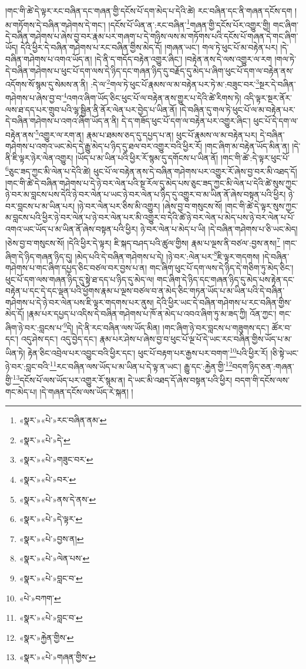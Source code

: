 །གང་གི་ཚེ་དེ་ལྟར་རང་བཞིན་དང་གཞན་གྱི་དངོས་པོ་དག་མེད་པ་དེའི་ཚེ། རང་བཞིན་དང་ནི་གཞན་དངོས་དག །མ་གཏོགས་དེ་བཞིན་གཤེགས་དེ་གང་། །དངོས་པོ་ཡིན་ན་:རང་བཞིན་\footnote{«སྣར་»«པེ་»རང་བཞིན་ནམ་}གཞན་གྱི་དངོས་པོར་འགྱུར་གྱི། གང་ཞིག་དེ་བཞིན་གཤེགས་པ་ཞེས་བྱ་བར་རྣམ་པར་གཞག་པ་དེ་གཉིས་ལས་མ་གཏོགས་པའི་དངོས་པོ་གཞན་དེ་གང་ཞིག་ཡོད། དེའི་ཕྱིར་དེ་བཞིན་གཤེགས་པ་རང་བཞིན་གྱིས་མེད་དོ། །གཞན་ཡང་། གལ་ཏེ་ཕུང་པོ་མ་བརྟེན་པར། །དེ་བཞིན་གཤེགས་པ་འགའ་ཡོད་ན། །དེ་ནི་ད་གདོད་བརྟེན་འགྱུར་ཞིང་། །བརྟེན་ནས་དེ་ལས་འགྱུར་ལ་རག །གལ་ཏེ་དེ་བཞིན་གཤེགས་པ་ཕུང་པོ་དག་ལས་དེ་ཉིད་དང་གཞན་ཉིད་དུ་བརྗོད་དུ་མེད་པ་ཞིག་ཕུང་པོ་དག་ལ་བརྟེན་ནས་འདོགས་སོ་སྙམ་དུ་སེམས་ན་ནི། :དེ་ལ་\footnote{«སྣར་»«པེ་»དེ་}གལ་ཏེ་ཕུང་པོ་རྣམས་ལ་མ་བརྟེན་པར་ཏེ་མ་:བཟུང་བར་\footnote{«སྣར་»«པེ་»གཟུང་བར་}སྔར་དེ་བཞིན་གཤེགས་པ་ཞེས་བྱ་བ་\footnote{«སྣར་»«པེ་»བར་}འགའ་ཞིག་ཡོད་ཅིང་ཕུང་པོ་ལ་བརྟེན་ནས་གྱུར་པ་དེའི་ཚེ་རིགས་ཏེ། འདི་ལྟར་སྔར་ནོར་ལས་ཐ་དད་པར་གྲུབ་པའི་ལྷ་སྦྱིན་ནི་ནོར་ལེན་པར་བྱེད་པ་ཡིན་ནོ། །དེ་བཞིན་དུ་གལ་ཏེ་ཕུང་པོ་ལ་མ་བརྟེན་པར་དེ་བཞིན་གཤེགས་པ་འགའ་ཞིག་ཡོད་ན་ནི། དེ་ད་གཟོད་ཕུང་པོ་དག་ལ་བརྟེན་པར་འགྱུར་ཞིང་། ཕུང་པོ་དེ་དག་ལ་བརྟེན་ནས་\footnote{«སྣར་»«པེ་»ནས་དེ་ནས་}འགྱུར་ལ་རག་ན། རྣམ་པ་ཐམས་ཅད་དུ་དཔྱད་པ་ན། ཕུང་པོ་རྣམས་ལ་མ་བརྟེན་པར། དེ་བཞིན་གཤེགས་པ་འགའ་ཡང་མེད་དེ་རྒྱུ་མེད་པ་ཉིད་དུ་ཐལ་བར་འགྱུར་བའི་ཕྱིར་རོ། །གང་ཞིག་མ་བརྟེན་ཡོད་མིན་ན། །དེ་ནི་ཇི་ལྟར་ཉེར་ལེན་འགྱུར། །ཡོད་པ་མ་ཡིན་པའི་ཕྱིར་རོ་སྙམ་དུ་དགོངས་པ་ཡིན་ནོ། །གང་གི་ཚེ་:དེ་ལྟར་ཕུང་པོ་\footnote{«སྣར་»«པེ་»དེ་ལྟར་}ཅུང་ཟད་ཀྱང་མི་ལེན་པ་དེའི་ཚེ། ཕུང་པོ་ལ་བརྟེན་ནས་དེ་བཞིན་གཤེགས་པར་འགྱུར་རོ་ཞེས་བྱ་བར་མི་འཐད་དོ། །གང་གི་ཚེ་དེ་བཞིན་གཤེགས་པ་དེ་ཉེ་བར་ལེན་པའི་སྔ་རོལ་དུ་མེད་པས་ཅུང་ཟད་ཀྱང་མི་ལེན་པ་དེའི་ཚེ་སུས་ཀྱང་ཉེ་བར་མ་བླངས་པས་དེའི་ཉེ་བར་ལེན་པ་ཡང་ཉེ་བར་ལེན་པ་ཉིད་དུ་འགྱུར་བ་མ་ཡིན་ནོ་ཞེས་བསྟན་པའི་ཕྱིར། ཉེ་བར་བླངས་པ་མ་ཡིན་པར། །ཉེ་བར་ལེན་པར་ཅིས་མི་འགྱུར། །ཞེས་བྱ་བ་གསུངས་སོ། །གང་གི་ཚེ་དེ་ལྟར་སུས་ཀྱང་མ་བླངས་པའི་ཕྱིར་ཉེ་བར་ལེན་པ་ཉེ་བར་ལེན་པར་མི་འགྱུར་བ་དེའི་ཚེ་ཉེ་བར་ལེན་པ་མེད་པས་ཉེ་བར་ལེན་པ་པོ་འགའ་ཡང་ཡོད་པ་མ་ཡིན་ནོ་ཞེས་བསྟན་པའི་ཕྱིར། ཉེ་བར་ལེན་པ་མེད་པ་ཡི། །དེ་བཞིན་གཤེགས་པ་ཅི་ཡང་མེད། །ཅེས་བྱ་བ་གསུངས་སོ། །དེའི་ཕྱིར་དེ་ལྟར། ཇི་སྐད་བཤད་པའི་ཚུལ་གྱིས། རྣམ་པ་ལྔས་ནི་བཙལ་:བྱས་ནས།\footnote{«སྣར་»«པེ་»བྱས་ན།} །གང་ཞིག་དེ་ཉིད་གཞན་ཉིད་དུ། །མེད་པའི་དེ་བཞིན་གཤེགས་པ་དེ། །ཉེ་བར་:ལེན་པར་\footnote{«སྣར་»«པེ་»ལེན་པས་}ཇི་ལྟར་གདགས། །དེ་བཞིན་གཤེགས་པ་གང་ཞིག་དཔྱད་ཅིང་བཙལ་བར་བྱས་པ་ན། གང་ཞིག་ཕུང་པོ་དག་ལས་དེ་ཉིད་དེ་གཅིག་ཏུ་མེད་ཅིང་། ཕུང་པོ་དག་ལས་གཞན་ཉིད་དུ་སྟེ་ཐ་དད་པ་ཉིད་དུ་མེད་ལ། གང་ཞིག་དེ་ཉིད་དང་གཞན་ཉིད་དུ་མེད་པས་རྟེན་དང་བརྟེན་པ་དང་དེ་དང་ལྡན་པའི་ཕྱོགས་རྣམ་པ་ལྔས་བཙལ་བ་ན་མེད་ཅིང་གཏན་ཡོད་པ་མ་ཡིན་པའི་དེ་བཞིན་གཤེགས་པ་དེ་ཉེ་བར་ལེན་པས་ཇི་ལྟར་གདགས་པར་ནུས། དེའི་ཕྱིར་ཡང་དེ་བཞིན་གཤེགས་པ་རང་བཞིན་གྱིས་མེད་དོ། །རྣམ་པར་དཔྱད་པ་འདིས་དེ་བཞིན་གཤེགས་པ་ཁོ་ན་མེད་པ་འབའ་ཞིག་ཏུ་མ་ཟད་ཀྱི། འོན་ཀྱང་། གང་ཞིག་ཉེ་བར་:བླངས་པ་\footnote{«སྣར་»«པེ་»བླང་བ་}དེ། །དེ་ནི་རང་བཞིན་ལས་ཡོད་མིན། །གང་ཞིག་ཉེ་བར་བླངས་པ་གཟུགས་དང་། ཚོར་བ་དང་། འདུ་ཤེས་དང་། འདུ་བྱེད་དང་། རྣམ་པར་ཤེས་པ་ཞེས་བྱ་བ་ཕུང་པོ་ལྔ་པོ་དེ་ཡང་རང་བཞིན་གྱིས་ཡོད་པ་མ་ཡིན་ཏེ། རྟེན་ཅིང་འབྲེལ་པར་འབྱུང་བའི་ཕྱིར་དང་། ཕུང་པོ་བརྟག་པར་རྒྱས་པར་བགག་\footnote{«པེ་»བཀག་}པའི་ཕྱིར་རོ། །ཅི་སྟེ་ཡང་ཉེ་བར་:བླང་བའི་\footnote{«སྣར་»«པེ་»བླང་བ་}རང་བཞིན་ལས་ཡོད་པ་མ་ཡིན་པ་དེ་ལྟ་ན་ཡང་། རྒྱུ་དང་:རྐྱེན་གྱི་\footnote{«སྣར་»རྐྱེན་གྱིས་}བདག་ཉིད་ཅན་:གཞན་གྱི་\footnote{«སྣར་»«པེ་»གཞན་གྱིས་}དངོས་པོ་ལས་ཡོད་པར་འགྱུར་རོ་སྙམ་ན། དེ་ཡང་མི་འཐད་དོ་ཞེས་བསྟན་པའི་ཕྱིར། བདག་གི་དངོས་ལས་གང་མེད་པ། །དེ་གཞན་དངོས་ལས་ཡོད་རེ་སྐན། །
